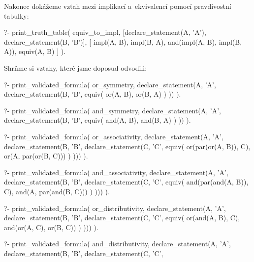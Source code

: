 Nakonec dokážeme vztah mezi implikací a~ekvivalencí pomocí pravdivostní tabulky:


\begin{prolog}
?- print_truth_table(
	equiv_to_impl,
	[declare_statement(A, 'A'), declare_statement(B, 'B')],
	[
		impl(A, B),
		impl(B, A),
		and(impl(A, B), impl(B, A)),
		equiv(A, B)
	]
).
\end{prolog}

Shrňme si vztahy, které jsme doposud odvodili:

\begin{fact}
\begin{prolog}
?- print_validated_formula(
	or_symmetry,
	declare_statement(A, 'A', declare_statement(B, 'B',
		equiv(
			or(A, B),
			or(B, A)
		)
	))
).
\end{prolog}
\begin{prolog}
?- print_validated_formula(
	and_symmetry,
	declare_statement(A, 'A', declare_statement(B, 'B',
		equiv(
			and(A, B),
			and(B, A)
		)
	))
).
\end{prolog}
\begin{prolog}
?- print_validated_formula(
	or_associativity,
	declare_statement(A, 'A', declare_statement(B, 'B', declare_statement(C, 'C',
		equiv(
			or(par(or(A, B)), C),
			or(A, par(or(B, C)))
		)
	)))
).
\end{prolog}
\begin{prolog}
?- print_validated_formula(
	and_associativity,
	declare_statement(A, 'A', declare_statement(B, 'B', declare_statement(C, 'C',
		equiv(
			and(par(and(A, B)), C),
			and(A, par(and(B, C)))
		)
	)))
).
\end{prolog}
\begin{prolog}
?- print_validated_formula(
	or_distributivity,
	declare_statement(A, 'A', declare_statement(B, 'B', declare_statement(C, 'C',
		equiv(
			or(and(A, B), C),
			and(or(A, C), or(B, C))
		)
	)))
).
\end{prolog}
\begin{prolog}
?- print_validated_formula(
	and_distributivity,
	declare_statement(A, 'A', declare_statement(B, 'B', declare_statement(C, 'C',

\end{prolog}
\end{fact}
